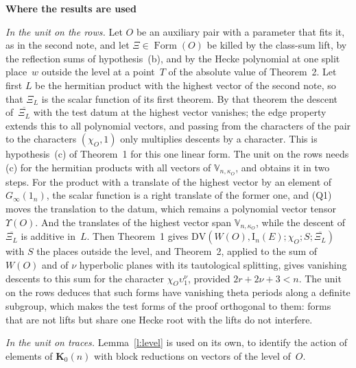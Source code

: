 \documentclass[11pt,a4paper]{article}
\newcommand{\m}[1]{\mbox{$#1$}}        %
\newcommand{\sect}[2]{\refstepcounter{section}\label{#2}\par\addvspace{19pt plus 4pt minus 2pt}\Needspace{7\baselineskip}%
  \noindent\llap{{\fontsize{13.2}{16}\selectfont\bfseries\color{inkfaint}\thesection}\hspace{9pt}}%
  {\fontsize{13.2}{16}\selectfont\bfseries\color{ink}#1}\par\nopagebreak\vspace{-1pt}}
\theoremstyle{plainx}
\theoremstyle{uprightx}
\newcommand{\Ginf}[1]{G_{\infty}(#1)}
\newcommand{\Kz}[1]{\mathbf{K}_{0}(#1)}
\newcommand{\std}[2]{\mathrm{I}_{#2}(#1)}
\newcommand{\one}[1]{1_{#1}}
\newcommand{\WO}[1]{W(#1)}
\newcommand{\kap}[1]{\kappa_{#1}}
\newcommand{\chO}[1]{\chi_{#1}}
\newcommand{\Ups}[1]{\Upsilon(#1)}
\newcommand{\FormO}[1]{\operatorname{Form}(#1)}
\newcommand{\Vk}[2]{\mathbb{V}_{#1,#2}}
\newcommand{\coef}[2]{#2_{#1}}
\newcommand{\DV}[5]{\mathrm{DV}(#1,#2;#3;#4;#5)}
\newcommand{\conj}[1]{\overline{#1}}
\begin{document}
\sect{Where the results are used}{s:use}
\emph{In the unit on the rows.} Let $O$ be an auxiliary pair with a parameter that fits it, as in the second
note, and let \m{\Xi\in\FormO{O}} be killed by the class-sum lift, by the reflection sums of hypothesis~(b), and by
the Hecke polynomial at one split place~$w$ outside the level at a point~$T$ of the absolute value of Theorem~2.
Let first $L$ be the hermitian product with the highest vector of the second note, so that \m{\coef{L}{\Xi}} is
the scalar function of its first theorem. By that theorem the descent of~$\conj{\coef{L}{\Xi}}$ with the test datum
at the highest vector vanishes; the edge property extends this to all polynomial vectors, and passing from the
characters of the pair to the characters \m{(\chO{O},1)} only multiplies descents by a character. This is
hypothesis~(c) of Theorem~1 for this one linear form. The unit on the rows needs (c) for the hermitian products
with all vectors of \m{\Vk{n}{\kap{O}}}, and obtains it in two steps. For the product with a translate of the highest
vector by an element of \m{\Ginf{\one{n}}}, the scalar function is a right translate of the former one, and (Q1)
moves the translation to the datum, which remains a polynomial vector tensor~\m{\Ups{O}}. And the translates of
the highest vector span \m{\Vk{n}{\kap{O}}}, while the descent of~$\conj{\coef{L}{\Xi}}$ is additive in~$L$. Then
Theorem~1 gives
\m{\DV{\WO{O}}{\std{E}{n}}{\chO{O}}{S}{\conj{\coef{L}{\Xi}}}} with $S$ the places outside the level, and Theorem~2, applied
to the sum of~\m{\WO{O}} and of $\nu$ hyperbolic planes with its tautological splitting, gives vanishing descents
to this sum for the character \m{\chO{O}\upsilon_{1}^{\nu}}, provided \m{2r+2\nu+3<n}. The unit on the rows deduces that
such forms have vanishing theta periods along a definite subgroup, which makes the test forms of the proof
orthogonal to them: forms that are not lifts but share one Hecke root with the lifts do not interfere.

\emph{In the unit on traces.} Lemma~\ref{l:level} is used on its own, to identify the action of elements of
\m{\Kz{n}} with block reductions on vectors of the level of~$O$.
\end{document}
